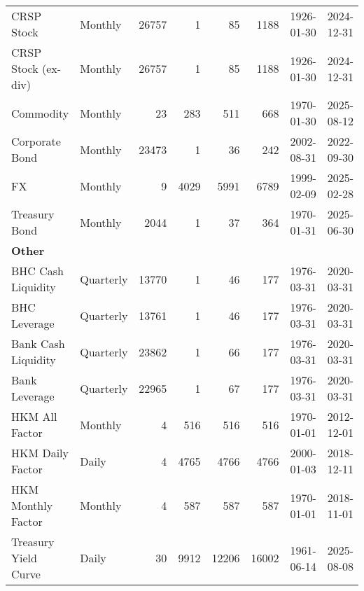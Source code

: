 \begin{tabular}{@{}llrrrrll@{}}
CRSP Stock & Monthly & 26757 & 1 & 85 & 1188 & 1926-01-30 & 2024-12-31 \\
CRSP Stock (ex-div) & Monthly & 26757 & 1 & 85 & 1188 & 1926-01-30 & 2024-12-31 \\
Commodity & Monthly & 23 & 283 & 511 & 668 & 1970-01-30 & 2025-08-12 \\
Corporate Bond & Monthly & 23473 & 1 & 36 & 242 & 2002-08-31 & 2022-09-30 \\
FX & Monthly & 9 & 4029 & 5991 & 6789 & 1999-02-09 & 2025-02-28 \\
Treasury Bond & Monthly & 2044 & 1 & 37 & 364 & 1970-01-31 & 2025-06-30 \\
\midrule
\multicolumn{8}{l}{\textbf{Other}} \\
BHC Cash Liquidity & Quarterly & 13770 & 1 & 46 & 177 & 1976-03-31 & 2020-03-31 \\
BHC Leverage & Quarterly & 13761 & 1 & 46 & 177 & 1976-03-31 & 2020-03-31 \\
Bank Cash Liquidity & Quarterly & 23862 & 1 & 66 & 177 & 1976-03-31 & 2020-03-31 \\
Bank Leverage & Quarterly & 22965 & 1 & 67 & 177 & 1976-03-31 & 2020-03-31 \\
HKM All Factor & Monthly & 4 & 516 & 516 & 516 & 1970-01-01 & 2012-12-01 \\
HKM Daily Factor & Daily & 4 & 4765 & 4766 & 4766 & 2000-01-03 & 2018-12-11 \\
HKM Monthly Factor & Monthly & 4 & 587 & 587 & 587 & 1970-01-01 & 2018-11-01 \\
Treasury Yield Curve & Daily & 30 & 9912 & 12206 & 16002 & 1961-06-14 & 2025-08-08 \\
\bottomrule
\end{tabular}